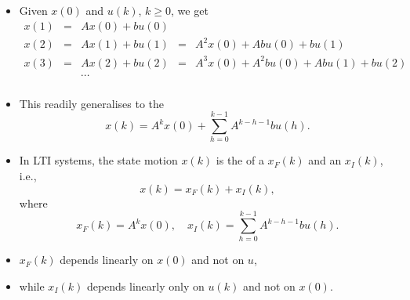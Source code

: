 \begin{frame}
\framesubtitleTC{}
\myPause
\begin{itemize}[<+-| alert@+>]
\item Given $x(0)$ and $u(k)$, $k \geq 0$, we get
      {\small
      \begin{displaymath}
       \begin{array}{rclcl}
        x(1) &=& Ax(0)+bu(0) \\
        x(2) &=& Ax(1)+bu(1) &=& A^2x(0)+Abu(0)+bu(1) \\
        x(3) &=& Ax(2)+bu(2) &=& A^3x(0)+A^2bu(0)+Abu(1)+bu(2) \\
             & & \cdots\\
       \end{array}
      \end{displaymath}
      }
\item This readily generalises to the 
      \begin{displaymath}
       x(k) = A^k x(0) +\sum\limits_{h=0}^{k-1} A^{k-h-1}bu(h).
      \end{displaymath}
\end{itemize}
\end{frame}

\begin{frame}
\framesubtitleTC{}
\myPause
\begin{itemize}[<+-| alert@+>]
\item In LTI systems, the state motion $x(k)$ is the  of a  $x_F(k)$ and an
       $x_I(k)$, i.e.,
      \begin{displaymath}
       x(k) = x_F(k) + x_I(k),
      \end{displaymath} \myPause
      where
      \begin{displaymath}
       x_F(k) = A^k x(0), \quad
       x_I(k) = \sum\limits_{h=0}^{k-1} A^{k-h-1}bu(h).
      \end{displaymath} \myPause
\item $x_F(k)$ depends linearly on $x(0)$ and not on $u$,
\item while $x_I(k)$ depends linearly only on $u(k)$ and not on $x(0)$.
\end{itemize}
\end{frame}

